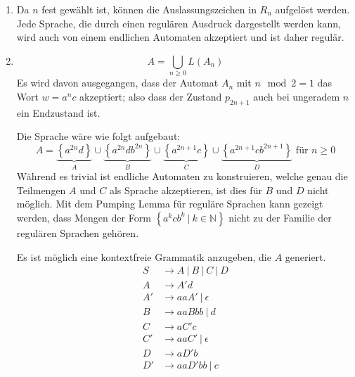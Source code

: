 \documentclass[a4paper]{scrartcl}
\begin{document}
\begin{enumerate}
    \item
        Da $n$ fest gewählt ist, können die Auslassungszeichen in $R_n$
        aufgelöst werden.
        Jede Sprache, die durch einen regulären Ausdruck dargestellt werden
        kann, wird auch von einem endlichen Automaten akzeptiert und ist daher
        regulär.

    \item
        \begin{equation}
            A = \bigcup_{n \geq 0} L(A_n)
        \end{equation}
        Es wird davon ausgegangen, dass der Automat $A_n$ mit $n \mod 2 = 1$ das
        Wort $w = a^nc$ akzeptiert; also dass der Zustand $p_{2n+1}$ auch bei
        ungeradem $n$ ein Endzustand ist.

        Die Sprache wäre wie folgt aufgebaut:
        \begin{equation}
            A =  \underbrace{\left\{ a^{2n}d \right\}}_A
            \cup \underbrace{\left\{ a^{2n}db^{2n} \right\}}_B
            \cup \underbrace{\left\{ a^{2n+1}c \right\}}_C
            \cup \underbrace{\left\{ a^{2n+1}cb^{2n+1} \right\}}_D
            \text{ für } n \geq 0
        \end{equation}
        Während es trivial ist endliche Automaten zu konstruieren, welche genau
        die Teilmengen $A$ und $C$ als Sprache akzeptieren, ist dies für $B$
        und $D$ nicht möglich.
        Mit dem Pumping Lemma für reguläre Sprachen kann gezeigt werden, dass
        Mengen der Form $\left\{ a^kcb^k \  | \  k \in \mathbb{N} \right\}$ nicht
        zu der Familie der regulären Sprachen gehören.

        Es ist möglich eine kontextfreie Grammatik anzugeben, die $A$
        generiert.
        \begin{equation*}
            \begin{split}
                S  &\rightarrow A \ |\  B \ |\  C \ |\  D \\
                A  &\rightarrow A'd \\
                A' &\rightarrow aaA' \ |\  \epsilon \\
                B  &\rightarrow aaBbb \ |\ d \\
                C  &\rightarrow aC'c \\
                C' &\rightarrow aaC' \ |\  \epsilon \\
                D  &\rightarrow aD'b \\
                D' &\rightarrow aaD'bb \ |\ c
            \end{split}
        \end{equation*}
        
        

\end{enumerate}
\end{document}

